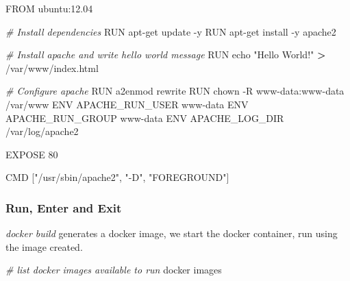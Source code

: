 \documentclass[
]{book}
\newenvironment{Shaded}{\begin{snugshade}}{\end{snugshade}}
\newcommand{\CommentTok}[1]{\textcolor[rgb]{0.56,0.35,0.01}{\textit{#1}}}
\newcommand{\ExtensionTok}[1]{#1}
\newcommand{\NormalTok}[1]{#1}
\newcommand{\OperatorTok}[1]{\textcolor[rgb]{0.81,0.36,0.00}{\textbf{#1}}}
\newcommand{\StringTok}[1]{\textcolor[rgb]{0.31,0.60,0.02}{#1}}
\begin{document}
\begin{Shaded}
\begin{Highlighting}[]
\ExtensionTok{FROM}\NormalTok{ ubuntu:12.04}

\CommentTok{\# Install dependencies}
\ExtensionTok{RUN}\NormalTok{ apt{-}get update {-}y}
\ExtensionTok{RUN}\NormalTok{ apt{-}get install {-}y apache2}

\CommentTok{\# Install apache and write hello world message}
\ExtensionTok{RUN}\NormalTok{ echo }\StringTok{"Hello World!"} \OperatorTok{\textgreater{}}\NormalTok{ /var/www/index.html}

\CommentTok{\# Configure apache}
\ExtensionTok{RUN}\NormalTok{ a2enmod rewrite}
\ExtensionTok{RUN}\NormalTok{ chown {-}R www{-}data:www{-}data /var/www}
\ExtensionTok{ENV}\NormalTok{ APACHE\_RUN\_USER www{-}data}
\ExtensionTok{ENV}\NormalTok{ APACHE\_RUN\_GROUP www{-}data}
\ExtensionTok{ENV}\NormalTok{ APACHE\_LOG\_DIR /var/log/apache2}

\ExtensionTok{EXPOSE}\NormalTok{ 80}

\ExtensionTok{CMD}\NormalTok{ [}\StringTok{"/usr/sbin/apache2"}\NormalTok{, }\StringTok{"{-}D"}\NormalTok{,  }\StringTok{"FOREGROUND"}\NormalTok{]}
\end{Highlighting}
\end{Shaded}

\hypertarget{run-enter-and-exit}{%
\subsubsection{Run, Enter and Exit}\label{run-enter-and-exit}}

\emph{docker build} generates a docker image, we start the docker container, run using the image created.

\begin{Shaded}
\begin{Highlighting}[]
\CommentTok{\# list docker images available to run}
\ExtensionTok{docker}\NormalTok{ images}
\end{Highlighting}
\end{Shaded}
\end{document}
